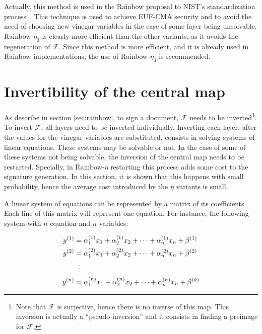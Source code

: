 \documentclass{ufsctex/ufsctex}
\begin{document}
Actually, this method is used in the Rainbow proposal to NIST's standardization
process~\cite{ding2017nist}. This technique is used to achieve
EUF-CMA
security and to avoid the need of choosing new vinegar variables in the case of
some layer being unsolvable. Rainbow-$\eta_3$ is clearly more efficient than
the other variants, as it avoids the regeneration of $\mathcal{F}$. Since this
method is more efficient, and it is already used in Rainbow implementations,
the use of Rainbow-$\eta_3$ is recommended.

\section{Invertibility of the central map}\label{sec:invertibility}

As describe in section \ref{sec:rainbow}, to sign a document, $\mathcal{F}$
needs to be inverted\footnote{Note that $\mathcal{F}$ is surjective, hence
there is no inverse of this map. This inversion is actually a
``pseudo-inversion'' and it consists in finding a preimage for $\mathcal{F}$.}.
To invert $\mathcal{F}$, all layers need to be inverted individually. Inverting
each layer, after the values for the vinegar variables are substituted,
consists in solving systems of linear equations. These systems may be solvable
or not. In the case of some of these systems not being solvable, the inversion
of the central map needs to be restarted. Specially, in Rainbow-$\eta$
restarting this process adds some cost to the signature generation. In this
section, it is shown that this happens with small probability, hence the
average cost introduced by the $\eta$ variants is small.

A linear system of equations can be represented by a matrix of its
coefficients. Each line of this matrix will represent one equation. For
instance, the following system with $n$ equation and $n$ variables:

\begin{equation}
\begin{split}
y^{(1)} &= \alpha^{(1)}_1 x_1 + \alpha^{(1)}_2 x_2 + \cdots +
	\alpha^{(1)}_n x_n + \beta^{(1)} \\
y^{(2)} &= \alpha^{(2)}_1 x_1 + \alpha^{(2)}_2 x_2 + \cdots +
	\alpha^{(2)}_n x_n + \beta^{(2)} \\
&\vdotswithin{=} \\
y^{(n)} &= \alpha^{(n)}_1 x_1 + \alpha^{(n)}_2 x_2 + \cdots +
	\alpha^{(n)}_n x_n + \beta^{(k)} \\
\end{split}
\end{equation}
\end{document}
